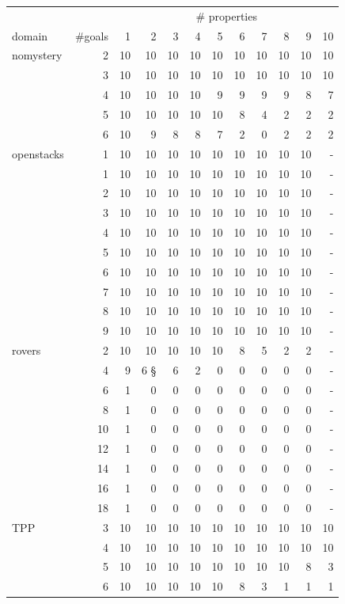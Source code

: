 \begin{figure}[ht]
	\begin{tabular}{l|r|rrrrrrrrrr}
		& & \multicolumn{10}{c}{\# properties} \\
		domain & \#goals & 1 & 2 & 3 & 4 & 5 & 6 & 7 & 8 & 9 & 10 \\\hline
		nomystery & 2 & 10 & 10 & 10 & 10 & 10 & 10 & 10 & 10 & 10 & 10\\\hline
				& 3 & 10 & 10 & 10 & 10 & 10 & 10 & 10 & 10 & 10 & 10\\\hline
				& 4 & 10 & 10 & 10 & 10 & 9 & 9 & 9 & 9 & 8 & 7\\\hline
				& 5 & 10 & 10 & 10 & 10 & 10 & 8 & 4 & 2 & 2 & 2\\\hline
				& 6 & 10 & 9 & 8 & 8 & 7 & 2 & 0 & 2 & 2 & 2\\\hline\hline
		openstacks & 1 & 10 & 10 & 10 & 10 & 10 & 10 & 10 & 10 & 10 & - \\\hline
				& 1 & 10 & 10 & 10 & 10 & 10 & 10 & 10 & 10 & 10 & - \\\hline
				& 2 & 10 & 10 & 10 & 10 & 10 & 10 & 10 & 10 & 10 & - \\\hline
				& 3 & 10 & 10 & 10 & 10 & 10 & 10 & 10 & 10 & 10 & - \\\hline
				& 4 & 10 & 10 & 10 & 10 & 10 & 10 & 10 & 10 & 10 & - \\\hline
				& 5 & 10 & 10 & 10 & 10 & 10 & 10 & 10 & 10 & 10 & - \\\hline
				& 6 & 10 & 10 & 10 & 10 & 10 & 10 & 10 & 10 & 10 & - \\\hline
				& 7 & 10 & 10 & 10 & 10 & 10 & 10 & 10 & 10 & 10 & - \\\hline
				& 8 & 10 & 10 & 10 & 10 & 10 & 10 & 10 & 10 & 10 & - \\\hline
				& 9 & 10 & 10 & 10 & 10 & 10 & 10 & 10 & 10 & 10 & - \\\hline\hline
		rovers & 2 & 10 & 10 & 10 & 10 & 10 & 8 & 5 & 2 & 2 &- \\\hline
				& 4 & 9 & 6 § & 6 & 2 & 0 & 0 & 0 & 0 & 0 & - \\\hline
				& 6 & 1 & 0 & 0 & 0 & 0 & 0 & 0 & 0 & 0 & - \\\hline 
				& 8 & 1 & 0 & 0 & 0 & 0 & 0 & 0 & 0 & 0 & - \\\hline 
				& 10 & 1 & 0 & 0 & 0 & 0 & 0 & 0 & 0 & 0 & - \\\hline 
				& 12 & 1 & 0 & 0 & 0 & 0 & 0 & 0 & 0 & 0 & - \\\hline 
				& 14 & 1 & 0 & 0 & 0 & 0 & 0 & 0 & 0 & 0 & - \\\hline 
				& 16 & 1 & 0 & 0 & 0 & 0 & 0 & 0 & 0 & 0 & - \\\hline 
				& 18 & 1 & 0 & 0 & 0 & 0 & 0 & 0 & 0 & 0 & - \\\hline\hline
		TPP & 3 & 10 & 10 & 10 & 10 & 10 & 10 & 10 & 10 & 10 & 10\\\hline
			& 4 & 10 & 10 & 10 & 10 & 10 & 10 & 10 & 10 & 10 & 10\\\hline
			& 5 & 10 & 10 & 10 & 10 & 10 & 10 & 10 & 10 & 8 & 3\\\hline
			& 6 & 10 & 10 & 10 & 10 & 10 & 8 & 3 & 1 & 1 & 1\\\hline



\end{tabular}
\end{figure}
